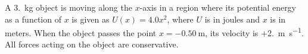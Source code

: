 \documentclass{../../oss-apphys-exam}
\begin{document}
\begin{questions}
%    
%    
  
  \question A \SI{3.}{\kilo\gram} object is moving along the $x$-axis in a
  region where its potential energy as a function of $x$ is given as
  $U(x)=4.0x^2$, where $U$ is in joules and $x$ is in meters. When the object
  passes the point $x=\SI{-0.50}\metre$, its velocity is
  $+$\SI{2.}{\metre\per\second}. All forces acting on the object are
  conservative.
\end{questions}
\end{document}
